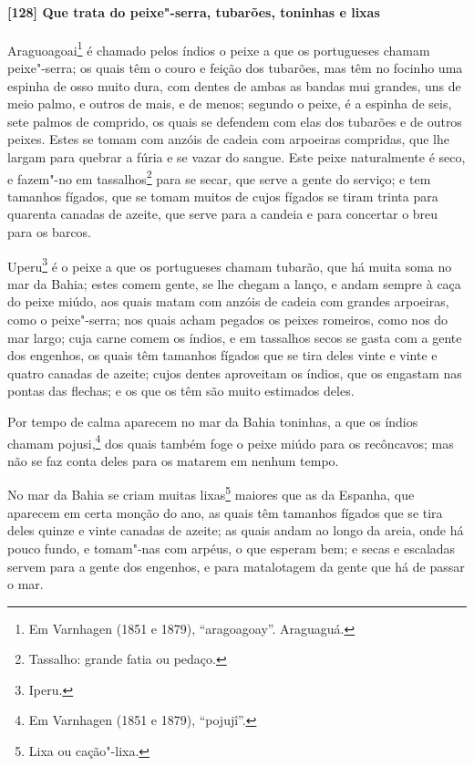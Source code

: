 \begin{linenumbers}
\paragraph{[128] Que trata do peixe"-serra, tubarões, toninhas e lixas}\quad
Araguoagoai\footnote{ Em Varnhagen (1851 e 1879), ``aragoagoay''. Araguaguá.} é chamado
pelos índios o peixe a que os portugueses chamam peixe"-serra; os quais têm o couro e
feição dos tubarões, mas têm no focinho uma espinha de osso muito dura, com dentes de
ambas as bandas mui grandes, uns de meio palmo, e outros de mais, e de menos; segundo o
peixe, é a espinha de seis, sete palmos de comprido, os quais se defendem com elas dos
tubarões e de outros peixes. Estes se tomam com anzóis de cadeia com arpoeiras compridas,
que lhe largam para quebrar a fúria e se vazar do sangue. Este peixe naturalmente é seco,
e fazem"-no em tassalhos\footnote{ Tassalho: grande fatia ou pedaço.} para se secar, que
serve a gente do serviço; e tem tamanhos fígados, que se tomam muitos de cujos
fígados se tiram trinta para quarenta canadas de azeite, que serve para a candeia e para
concertar o breu para os barcos.

Uperu\footnote{ Iperu.} é o peixe a que os portugueses chamam tubarão, que há muita soma
no mar da Bahia; estes comem gente, se lhe chegam a lanço, e andam sempre à caça do peixe
miúdo, aos quais matam com anzóis de cadeia com grandes arpoeiras, como o peixe"-serra; nos
quais acham pegados os peixes romeiros, como nos do mar largo; cuja carne comem os índios,
e em tassalhos secos se gasta com a gente dos engenhos, os quais têm tamanhos fígados que
se tira deles vinte e vinte e quatro canadas de azeite; cujos dentes aproveitam os índios,
que os engastam nas pontas das flechas; e os que os têm são muito estimados deles.

Por tempo de calma aparecem no mar da Bahia toninhas, a que os índios chamam
pojusi,\footnote{ Em Varnhagen (1851 e 1879), ``pojujî''.} dos quais também foge o peixe
miúdo para os recôncavos; mas não se faz conta deles para os matarem em nenhum tempo.

No mar da Bahia se criam muitas lixas\footnote{ Lixa ou cação"-lixa.} maiores que as da
Espanha, que aparecem em certa monção do ano, as quais têm tamanhos fígados que se tira
deles quinze e vinte canadas de azeite; as quais andam ao longo da areia, onde há pouco
fundo, e tomam"-nas com arpéus, o que esperam bem; e secas e escaladas servem para a gente
dos engenhos, e para matalotagem da gente que há de passar o mar.


\end{linenumbers}
